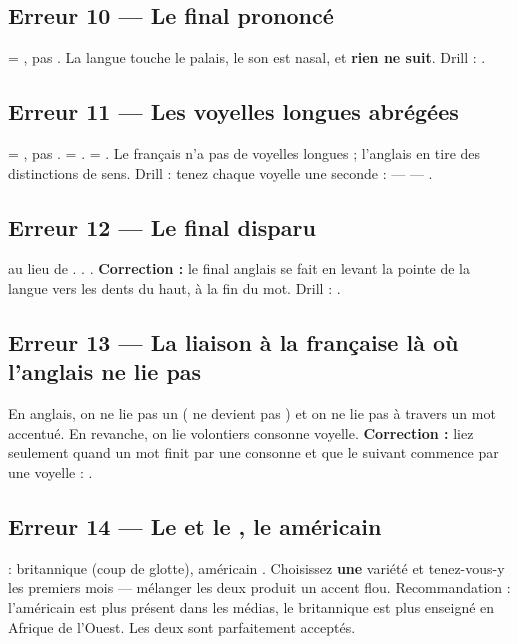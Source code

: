 \subsection{Erreur 10 --- Le  final prononcé }
 = , pas . La langue touche le palais, le son est nasal,
et \textbf{rien ne suit}. Drill : .

\subsection{Erreur 11 --- Les voyelles longues abrégées}
 = , pas .  = .  = .
Le français n'a pas de voyelles longues ; l'anglais en tire des distinctions de sens.
Drill : tenez chaque voyelle une seconde :  ---
 --- .

\subsection{Erreur 12 --- Le  final disparu}
  au lieu de .  .  .
\textbf{Correction :} le  final anglais se fait en levant la pointe de la langue vers
les dents du haut, à la fin du mot. Drill : .

\subsection{Erreur 13 --- La liaison à la française là où l'anglais ne lie pas}
En anglais, on ne lie pas un  ( ne devient pas ) et on
ne lie pas à travers un mot accentué. En revanche, on lie volontiers consonne \ra voyelle.
\textbf{Correction :} liez seulement quand un mot finit par une consonne et que le suivant
commence par une voyelle : .

\subsection{Erreur 14 --- Le  et le  , le  américain}
 : britannique  (coup de glotte), américain .
Choisissez \textbf{une} variété et tenez-vous-y les premiers mois --- mélanger les deux
produit un accent flou. Recommandation : l'américain est plus présent dans les médias,
le britannique est plus enseigné en Afrique de l'Ouest. Les deux sont parfaitement acceptés.

